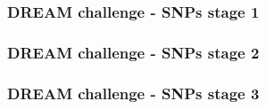 \documentclass{beamer}
\begin{document}
\begin{frame}
\frametitle{DREAM challenge - SNPs stage 1}
\end{frame}

\begin{frame}
\frametitle{DREAM challenge - SNPs stage 2}
\end{frame}

\begin{frame}
\frametitle{DREAM challenge - SNPs stage 3}
\end{frame}
\end{document}
